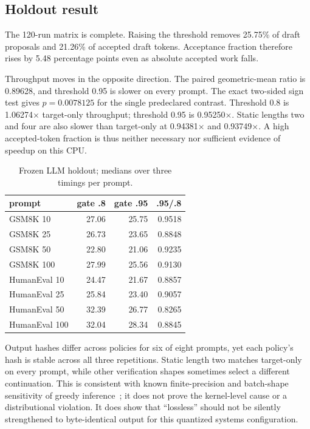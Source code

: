 \documentclass[conference]{IEEEtran}
\begin{document}
\subsection{Holdout result}
The 120-run matrix is complete. Raising the threshold removes 25.75\% of draft
proposals and 21.26\% of accepted draft tokens. Acceptance fraction therefore
rises by 5.48 percentage points even as absolute accepted work falls.

Throughput moves in the opposite direction. The paired geometric-mean ratio is
0.89628, and threshold 0.95 is slower on every prompt. The exact two-sided sign
test gives $p=0.0078125$ for the single predeclared contrast. Threshold 0.8 is
1.06274$\times$ target-only throughput; threshold 0.95 is 0.95250$\times$.
Static lengths two and four are also slower than target-only at 0.94381$\times$
and 0.93749$\times$. A high accepted-token fraction is thus neither necessary
nor sufficient evidence of speedup on this CPU.

\begin{table}[t]
\centering\small
\caption{Frozen LLM holdout; medians over three timings per prompt.}
\label{tab:llm}
\begin{tabular}{lrrr}
\toprule
prompt & gate .8 & gate .95 & .95/.8 \\
\midrule
GSM8K 10  & 27.06 & 25.75 & 0.9518 \\
GSM8K 25  & 26.73 & 23.65 & 0.8848 \\
GSM8K 50  & 22.80 & 21.06 & 0.9235 \\
GSM8K 100 & 27.99 & 25.56 & 0.9130 \\
HumanEval 10  & 24.47 & 21.67 & 0.8857 \\
HumanEval 25  & 25.84 & 23.40 & 0.9057 \\
HumanEval 50  & 32.39 & 26.77 & 0.8265 \\
HumanEval 100 & 32.04 & 28.34 & 0.8845 \\
\bottomrule
\end{tabular}
\end{table}

Output hashes differ across policies for six of eight prompts, yet each
policy's hash is stable across all three repetitions. Static length two matches
target-only on every prompt, while other verification shapes sometimes select
a different continuation. This is consistent with known finite-precision and
batch-shape sensitivity of greedy inference~\cite{numerics}; it does not prove
the kernel-level cause or a distributional violation. It does show that
``lossless'' should not be silently strengthened to byte-identical output for
this quantized systems configuration.
\end{document}
